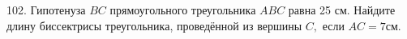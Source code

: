 102. Гипотенуза $BC$ прямоугольного треугольника $ABC$ равна 25 см. Найдите длину биссектрисы треугольника, проведённой из вершины $C,$ если $AC=7$см.\\
